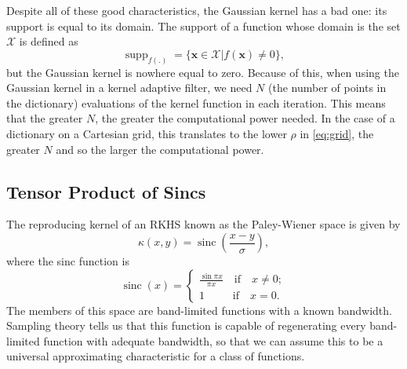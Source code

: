 Despite all of these good characteristics, the Gaussian kernel has a bad one: its support is equal to its domain. The support of a function whose domain is the set $\mathcal{X}$ is defined as \cite{rudin_functional_2007}
\begin{equation}
    \operatorname{supp}_{f(.)} = \{ \mathbf{x} \in \mathcal{X} | f(\mathbf{x}) \neq 0 \},
\end{equation}
but the Gaussian kernel is nowhere equal to zero. Because of this, when using the Gaussian kernel in a kernel adaptive filter, we need $N$ (the number of points in the dictionary) evaluations of the kernel function in each iteration. This means that the greater $N$, the greater the computational power needed. In the case of a dictionary on a Cartesian grid, this translates to the lower $\rho$ in \eqref{eq:grid}, the greater $N$ and so the larger the computational power.

\subsection{Tensor Product of Sincs}


The reproducing kernel of an RKHS known as the Paley-Wiener space is given by
\begin{equation}
\kappa(x,y) = \operatorname{sinc}\left( \frac{x-y}{\sigma}\right),
\end{equation}
where the sinc function is
\begin{equation}
    \operatorname{sinc}(x) = \begin{cases}
        \frac{\sin{\pi x}}{\pi x} \quad \text{if} \quad x \neq 0;\\
        1  \quad \;\; \quad \text{if} \quad x = 0.
    \end{cases}
\end{equation}
The members of this space are band-limited functions with a known bandwidth. Sampling theory tells us that this function is capable of regenerating every band-limited function with adequate bandwidth, so that we can assume this to be a universal approximating characteristic for a class of functions.

